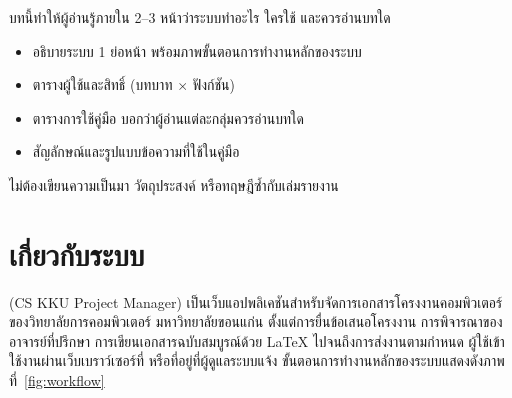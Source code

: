 \label{ch:overview}

\begin{guide}
บทนี้ทำให้ผู้อ่านรู้ภายใน 2--3 หน้าว่าระบบทำอะไร ใครใช้ และควรอ่านบทใด
\begin{itemize}
  \item อธิบายระบบ 1 ย่อหน้า พร้อมภาพขั้นตอนการทำงานหลักของระบบ
  \item ตารางผู้ใช้และสิทธิ์ (บทบาท $\times$ ฟังก์ชัน)
  \item ตารางการใช้คู่มือ บอกว่าผู้อ่านแต่ละกลุ่มควรอ่านบทใด
  \item สัญลักษณ์และรูปแบบข้อความที่ใช้ในคู่มือ
\end{itemize}
ไม่ต้องเขียนความเป็นมา วัตถุประสงค์ หรือทฤษฎีซ้ำกับเล่มรายงาน
\end{guide}

\section{เกี่ยวกับระบบ}

\systemname{} (CS KKU Project Manager) เป็นเว็บแอปพลิเคชันสำหรับจัดการเอกสารโครงงานคอมพิวเตอร์
ของวิทยาลัยการคอมพิวเตอร์ มหาวิทยาลัยขอนแก่น ตั้งแต่การยื่นข้อเสนอโครงงาน การพิจารณาของอาจารย์ที่ปรึกษา
การเขียนเอกสารฉบับสมบูรณ์ด้วย \LaTeX{} ไปจนถึงการส่งงานตามกำหนด
ผู้ใช้เข้าใช้งานผ่านเว็บเบราว์เซอร์ที่ \systemurl{} หรือที่อยู่ที่ผู้ดูแลระบบแจ้ง
ขั้นตอนการทำงานหลักของระบบแสดงดังภาพที่~\ref{fig:workflow}

